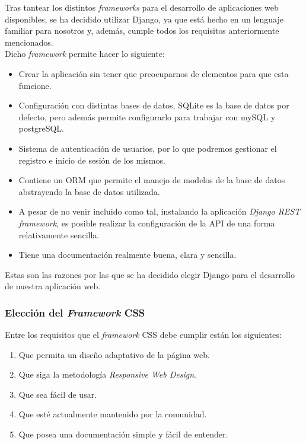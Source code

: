     Tras tantear los distintos \textit{frameworks} para el desarrollo de aplicaciones web
    disponibles, se ha decidido utilizar Django, ya que está hecho en un lenguaje familiar
    para nosotros y, además, cumple todos los requisitos anteriormente mencionados.\\

    Dicho \textit{framework} permite hacer lo siguiente:
        
        \begin{itemize}
            \item Crear la aplicación sin tener que preocuparnos de elementos para que
            esta funcione.
            \item Configuración con distintas bases de datos, SQLite es la base de datos
            por defecto, pero además permite configurarlo para trabajar con mySQL y
            postgreSQL.
            \item Sistema de autenticación de usuarios, por lo que podremos gestionar el
            registro e inicio de sesión de los mismos.
            \item Contiene un ORM que permite el manejo de modelos de la base de datos
            abstrayendo la base de datos utilizada.
            \item A pesar de no venir incluido como tal, instalando la aplicación
            \textit{Django REST framework}, es posible realizar la configuración de la API
            de una forma relativamente sencilla.
            \item Tiene una documentación realmente buena, clara y sencilla.
        \end{itemize}
    
    Estas son las razones por las que se ha decidido elegir Django para el desarrollo de
    nuestra aplicación web.

    \subsubsection{Elección del \textit{Framework} CSS}
    Entre los requisitos que el \textit{framework} CSS debe cumplir están los siguientes:

        \begin{enumerate}
            \item Que permita un diseño adaptativo de la página web.
            \item Que siga la metodología \textit{Responsive Web Design}.
            \item Que sea fácil de usar.
            \item Que esté actualmente mantenido por la comunidad.
            \item Que posea una documentación simple y fácil de entender. 
        \end{enumerate}


